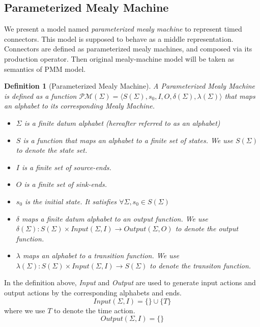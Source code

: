 \documentclass[conference, a4paper]{IEEEtran}
\newtheorem{definition}{Definition}
\begin{document}
\subsection{Parameterized Mealy Machine}
We present a model named \emph{parameterized mealy machine} to represent timed connectors. This
model is supposed to behave as a middle representation. Connectors are defined as parameterized
mealy machines, and composed via its production operator. Then original mealy-machine model will be
taken as semantics of PMM model.

\begin{definition}[Parameterized Mealy Machine]
  A \emph{Parameterized Mealy Machine} is defined as a function $\mathcal{PM}(\Sigma)=\langle
  S(\Sigma), s_0, I, O, \delta(\Sigma), \lambda(\Sigma)\rangle$ that maps an
  alphabet to its corresponding Mealy Machine. 
  \begin{itemize}
    \item[-] $\Sigma$ is a \emph{finite} datum alphabet (hereafter referred to as an alphabet)
    \item[-] $S$ is a function that maps an alphabet to a \emph{finite} set of
      states. We use $S(\Sigma)$ to denote the state set.
    \item[-] $I$ is a finite set of source-ends.
    \item[-] $O$ is a finite set of sink-ends.
    \item[-] $s_0$ is the initial state. It satisfies $\forall \Sigma,s_0\in S(\Sigma)$
    \item[-] $\delta$ maps a \emph{finite} datum alphabet to an \emph{output function}. We use
      $\delta(\Sigma):S(\Sigma)\times Input(\Sigma,I)\rightarrow Output(\Sigma, O)$ to denote the output function.
    \item[-] $\lambda$ maps an alphabet to a \emph{transition function}. We use
      $\lambda(\Sigma):S(\Sigma)\times Input(\Sigma,I)\rightarrow S(\Sigma)$ to denote the transiton
      function.
  \end{itemize}
\end{definition}

In the definition above, \emph{Input} and \emph{Output} are used to generate input actions and output actions by the corresponding alphabets and ends.
\[
Input(\Sigma,I)=\{\}\cup\{T\}
\]
where we use $T$ to denote the time action.
\[
Output(\Sigma,I)=\{\}
\]
\end{document}

